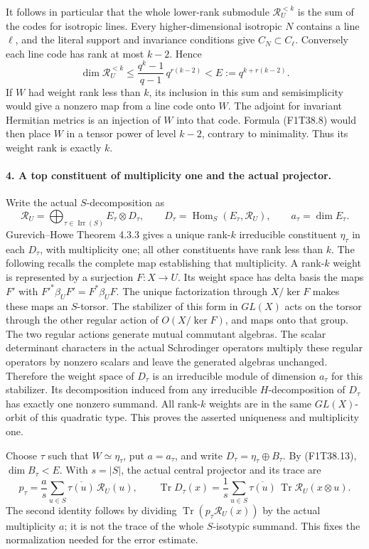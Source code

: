 It follows in particular that the whole lower-rank
submodule \(\mathcal R_U^{<k}\) is the sum of the codes
for isotropic lines. Every higher-dimensional isotropic
\(N\) contains a line \(\ell\), and the literal
support and invariance conditions give \(C_N\subset C_\ell\).
Conversely each line code has rank at most \(k-2\).
Hence
\[
 \dim\mathcal R_U^{<k}
 \le\frac{q^k-1}{q-1}\,q^{r(k-2)}
 <E:=q^{k+r(k-2)}.
 \tag{F1T38.13}
\]
If \(W\) had weight rank less than \(k\), its inclusion
in this sum and semisimplicity would give a nonzero map
from a line code onto \(W\). The adjoint for invariant
Hermitian metrics is an injection of \(W\) into that
code. Formula (F1T38.8) would then place \(W\) in a
tensor power of level \(k-2\), contrary to minimality.
Thus its weight rank is exactly \(k\).

\paragraph{4. A top constituent of multiplicity one and the actual projector.}
Write the actual \(S\)-decomposition as
\[
 \mathcal R_U=\bigoplus_{\tau\in\operatorname{Irr}(S)}
                 E_\tau\otimes D_\tau,
 \qquad D_\tau=\operatorname{Hom}_S(E_\tau,\mathcal R_U),
 \qquad a_\tau=\dim E_\tau.
 \tag{F1T38.14}
\]
Gurevich--Howe Theorem 4.3.3 gives a unique rank-\(k\)
irreducible constituent \(\eta_\tau\) in each \(D_\tau\),
with multiplicity one; all other constituents have
rank less than \(k\). The following recalls the complete
map establishing that multiplicity. A rank-\(k\) weight
is represented by a surjection \(F:X\to U\).
Its weight space has delta basis the maps \(F'\) with
\(F'^*\beta_UF'=F^*\beta_UF\). The unique factorization
through \(X/\ker F\) makes these maps an \(S\)-torsor.
The stabilizer of this form in \(GL(X)\) acts on the
torsor through the other regular action of
\(O(X/\ker F)\), and maps onto that group. The two
regular actions generate mutual commutant algebras.
The scalar determinant characters in the actual
Schrodinger operators multiply these regular operators
by nonzero scalars and leave the generated algebras
unchanged. Therefore the weight space of \(D_\tau\)
is an irreducible module of dimension \(a_\tau\) for
this stabilizer. Its decomposition induced from any
irreducible \(H\)-decomposition of \(D_\tau\) has exactly
one nonzero summand. All rank-\(k\) weights are in the
same \(GL(X)\)-orbit of this quadratic type. This proves
the asserted uniqueness and multiplicity one.

Choose \(\tau\) such that \(W\simeq\eta_\tau\), put
\(a=a_\tau\), and write \(D_\tau=\eta_\tau\oplus B_\tau\).
By (F1T38.13), \(\dim B_\tau<E\). With \(s=|S|\), the
actual central projector and its trace are
\[
 p_\tau=\frac a s\sum_{u\in S}\overline{\tau(u)}\,\mathcal R_U(u),
 \qquad
 \operatorname{Tr}D_\tau(x)
   =\frac1s\sum_{u\in S}\overline{\tau(u)}\,
                            \operatorname{Tr}\mathcal R_U(x\otimes u).
 \tag{F1T38.15}
\]
The second identity follows by dividing
\(\operatorname{Tr}(p_\tau\mathcal R_U(x))\) by the
actual multiplicity \(a\); it is not the trace of the
whole \(S\)-isotypic summand. This fixes the normalization
needed for the error estimate.

